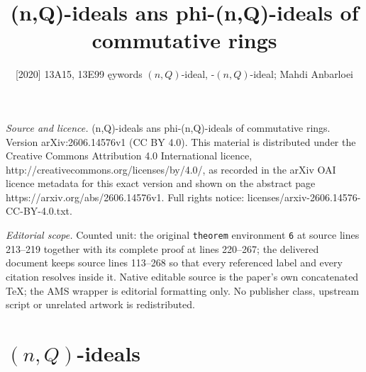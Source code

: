 \documentclass[10pt,a4paper]{amsart}
\numberwithin{equation}{section}
\begin{document}
\title[(n,Q)-ideals ans phi-(n,Q)-ideals of commutative rings]{(n,Q)-ideals ans phi-(n,Q)-ideals of commutative rings}
\author{[2020] 13A15, 13E99 ęywords $(n,Q)$-ideal, $ $-$(n,Q)$-ideal; Mahdi Anbarloei}
\date{}
\maketitle
\noindent\emph{Source and licence.} (n,Q)-ideals ans phi-(n,Q)-ideals of commutative rings. Version arXiv:2606.14576v1 (CC BY 4.0). This material is distributed under the Creative Commons Attribution 4.0 International licence, http://creativecommons.org/licenses/by/4.0/, as recorded in the arXiv OAI licence metadata for this exact version and shown on the abstract page https://arxiv.org/abs/2606.14576v1. Full rights notice: licenses/arxiv-2606.14576-CC-BY-4.0.txt.\par\smallskip
\noindent\textit{Editorial scope.} Counted unit: the original \texttt{theorem} environment \texttt{6} at source lines 213--219 together with its complete proof at lines 220--267; the delivered document keeps source lines 113--268 so that every referenced label and every citation resolves inside it. Native editable source is the paper's own concatenated TeX; the AMS wrapper is editorial formatting only. No publisher class, upstream script or unrelated artwork is redistributed.
\section{$(n,Q)$-ideals}
\end{document}
